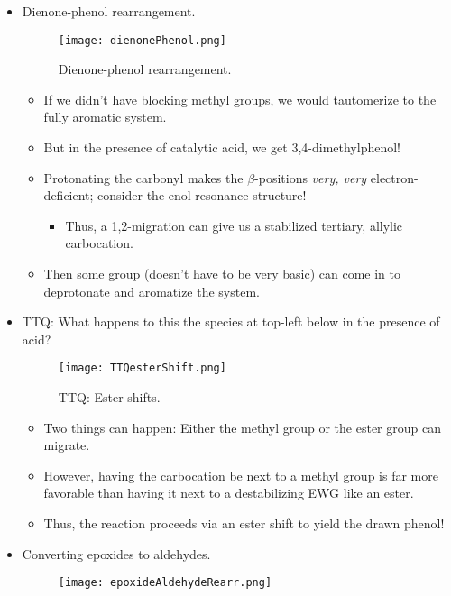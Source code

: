 \documentclass[../notes.tex]{subfiles}
\begin{document}
\begin{itemize}
\begin{itemize}
    \end{itemize}
    \item Dienone-phenol rearrangement.
    \begin{figure}[h!]
        \centering
        \texttt{[image: dienonePhenol.png]}
        \caption{Dienone-phenol rearrangement.}
        \label{fig:dienonePhenol}
    \end{figure}
    \pagebreak
    \begin{itemize}
        \item If we didn't have blocking methyl groups, we would tautomerize to the fully aromatic system.
        \item But in the presence of catalytic acid, we get 3,4-dimethylphenol!
        \item Protonating the carbonyl makes the $\beta$-positions \emph{very, very} electron-deficient; consider the enol resonance structure!
        \begin{itemize}
            \item Thus, a 1,2-migration can give us a stabilized tertiary, allylic carbocation.
        \end{itemize}
        \item Then some group (doesn't have to be very basic) can come in to deprotonate and aromatize the system.
    \end{itemize}
    \item TTQ: What happens to this the species at top-left below in the presence of acid?
    \begin{figure}[h!]
        \centering
        \texttt{[image: TTQesterShift.png]}
        \caption{TTQ: Ester shifts.}
        \label{fig:TTQesterShift}
    \end{figure}
    \begin{itemize}
        \item Two things can happen: Either the methyl group or the ester group can migrate.
        \item However, having the carbocation be next to a methyl group is far more favorable than having it next to a destabilizing EWG like an ester.
        \item Thus, the reaction proceeds via an ester shift to yield the drawn phenol!
    \end{itemize}
    \item Converting epoxides to aldehydes.
    \begin{figure}[h!]
        \centering
        \texttt{[image: epoxideAldehydeRearr.png]}

\end{figure}
\end{itemize}
\end{document}
